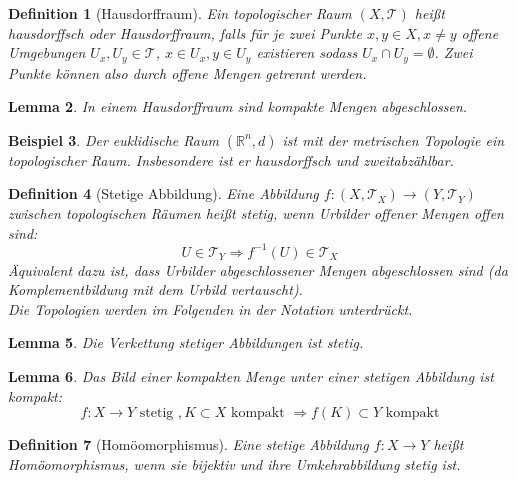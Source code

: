 \documentclass[a4paper]{scrreprt}
\numberwithin{equation}{chapter}
\newcommand{\R}{\mathds{R}}
\theoremstyle{plain}
\newtheorem{defn}{Definition}[section]
\newtheorem{lemma}[defn]{Lemma}
\newtheorem{bsp}[defn]{Beispiel}
\begin{document}
		\begin{defn}[Hausdorffraum]
			Ein topologischer Raum $(X,\mathcal{T})$ heißt hausdorffsch oder Hausdorffraum, falls für je zwei Punkte $x,y\in X, x\neq y$ offene Umgebungen ${U_x,U_y\in\mathcal{T}}$, ${x\in U_x}, {y\in U_y}$ existieren sodass $U_x\cap U_y=\emptyset$. Zwei Punkte können also durch offene Mengen \glqq getrennt \grqq werden.
		\end{defn}
		\begin{lemma}
			In einem Hausdorffraum sind kompakte Mengen abgeschlossen.
		\end{lemma}
		\begin{bsp}
			Der euklidische Raum $(\R^n,d)$ ist mit der metrischen Topologie ein topologischer Raum. Insbesondere ist er hausdorffsch und zweitabzählbar.
		\end{bsp}
		\begin{defn}[Stetige Abbildung]
			Eine Abbildung $f:(X,\mathcal{T}_X)\rightarrow (Y,\mathcal{T}_Y)$ zwischen topologischen Räumen heißt stetig, wenn Urbilder offener Mengen offen sind:
			\begin{equation*}
				U\in\mathcal{T}_Y \Rightarrow f^{-1}(U)\in\mathcal{T}_X
			\end{equation*}
			Äquivalent dazu ist, dass Urbilder abgeschlossener Mengen abgeschlossen sind (da Komplementbildung mit dem Urbild vertauscht).\\
			Die Topologien werden im Folgenden in der Notation unterdrückt.
		\end{defn}
		\begin{lemma}
			Die Verkettung stetiger Abbildungen ist stetig.
		\end{lemma}
		\begin{lemma}
			Das Bild einer kompakten Menge unter einer stetigen Abbildung ist kompakt:
			\begin{equation*}
				f:X\rightarrow Y \text{ stetig }, K\subset X \text{ kompakt }\Rightarrow f(K)\subset Y \text{ kompakt}
			\end{equation*}
		\end{lemma}
		\begin{defn}[Homöomorphismus]
			Eine stetige Abbildung $f:X\rightarrow Y$ heißt Homöomorphismus, wenn sie bijektiv und ihre Umkehrabbildung stetig ist.
		\end{defn}
\end{document}
